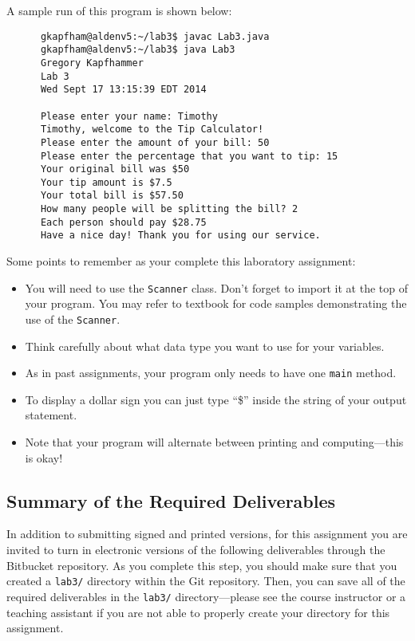 \noindent
A sample run of this program is shown below:

\begin{verbatim}
      gkapfham@aldenv5:~/lab3$ javac Lab3.java
      gkapfham@aldenv5:~/lab3$ java Lab3
      Gregory Kapfhammer
      Lab 3
      Wed Sept 17 13:15:39 EDT 2014

      Please enter your name: Timothy
      Timothy, welcome to the Tip Calculator!
      Please enter the amount of your bill: 50
      Please enter the percentage that you want to tip: 15
      Your original bill was $50
      Your tip amount is $7.5
      Your total bill is $57.50
      How many people will be splitting the bill? 2
      Each person should pay $28.75
      Have a nice day! Thank you for using our service.

\end{verbatim}
\vspace{-0.2in}
Some points to remember as your complete this laboratory assignment:

\begin{itemize}

\item You will need to use the {\tt Scanner} class. Don't forget to import it at the top of your program. You may refer to
  textbook for code samples demonstrating the use of the {\tt Scanner}.

\item Think carefully about what data type you want to use for your variables.

\item As in past assignments, your program only needs to have one {\tt main} method.

\item To display a dollar sign you can just type ``\$'' inside the string of your output statement.

\item Note that your program will alternate between printing and computing---this
is okay!

\end{itemize}

\vspace{-0.2in}
\subsection*{Summary of the Required Deliverables}

In addition to submitting signed and printed versions, for this assignment you are invited to turn in electronic
versions of the following deliverables through the Bitbucket repository. As you complete this step, you should make sure
that you created a {\tt lab3/} directory within the Git repository.  Then, you can save all of the required deliverables
in the {\tt lab3/} directory---please see the course instructor or a teaching assistant if you are not able to properly
create your directory for this assignment.

